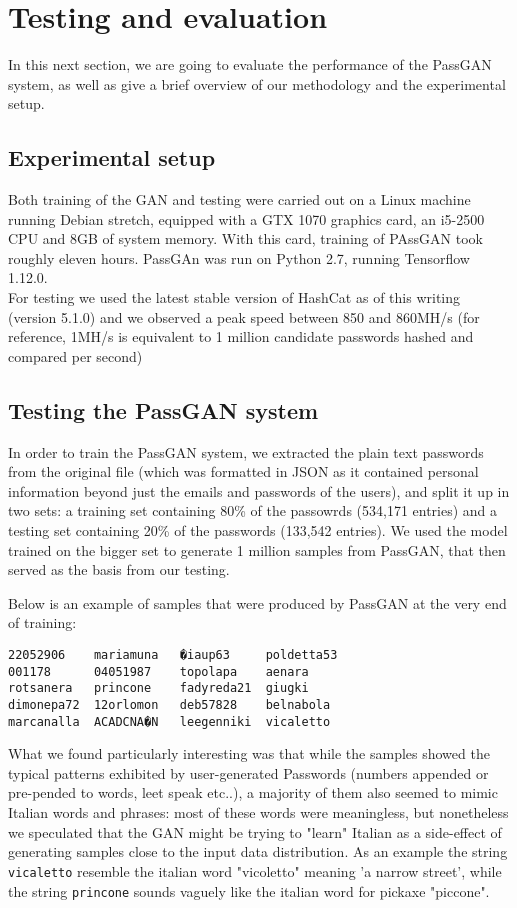 \section{Testing and evaluation}
In this next section, we are going to evaluate the performance of the PassGAN system, as well as give a brief overview of our methodology and the experimental setup.

\subsection{Experimental setup}
Both training of the GAN and testing were carried out on a Linux machine running Debian stretch, equipped with a GTX 1070 graphics card, an i5-2500 CPU and 8GB of system memory. 
With this card, training of PAssGAN took roughly eleven hours.
PassGAn was run on Python 2.7, running Tensorflow 1.12.0.\\
For testing we used the latest stable version of HashCat as of this writing (version 5.1.0) and we observed a peak speed between 850 and 860MH/s (for reference, 1MH/s is equivalent to 1 million candidate passwords hashed and compared per second) %

\subsection{Testing the PassGAN system}
In order to train the PassGAN system, we extracted the plain text passwords from the original file (which was formatted in JSON as it contained personal information beyond just the emails and passwords of the users), and split it up in two sets: a training set containing 80\% of the passowrds (534,171 entries) and a testing set containing 20\% of the passwords (133,542 entries).
We used the model trained on the bigger set to generate 1 million samples from PassGAN, that then served as the basis from our testing.

Below is an example of samples that were produced by PassGAN at the very end of training: %
\begin{verbatim}
22052906    mariamuna   �iaup63     poldetta53
001178      04051987    topolapa    aenara
rotsanera   princone    fadyreda21  giugki
dimonepa72  12orlomon   deb57828    belnabola
marcanalla  ACADCNA�N   leegenniki  vicaletto
\end{verbatim}

What we found particularly interesting was that while the samples showed the typical patterns exhibited by user-generated Passwords (numbers appended or pre-pended to words, leet speak etc..), a majority of them also seemed to mimic Italian words and phrases: most of these words were meaningless, but nonetheless we speculated that the GAN might be trying to "learn" Italian as a side-effect of generating samples close to the input data distribution.
As an example the string \texttt{vicaletto} resemble the italian word "vicoletto" meaning 'a narrow street', while the string \texttt{princone} sounds vaguely like the italian word for pickaxe "piccone". 

